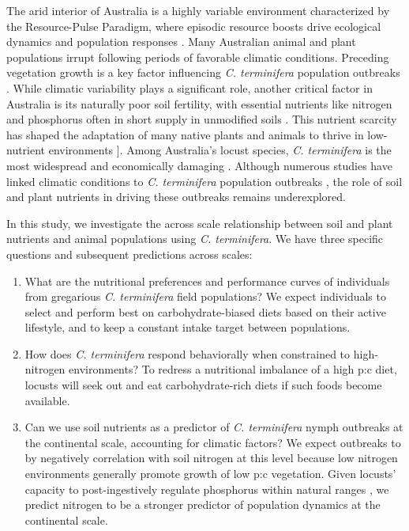 \documentclass[
]{article}
\begin{document}
The arid interior of Australia is a highly variable environment
\citep{morton_fresh_2011} characterized by the Resource-Pulse Paradigm,
where episodic resource boosts drive ecological dynamics and population
responses \citep{noy-meir_desert_1974, whitford_ecology_2002}. Many
Australian animal and plant populations irrupt following periods of
favorable climatic conditions. Preceding vegetation growth is a key
factor influencing \emph{C. terminifera} population outbreaks
\citep{lawton_seeing_2022}. While climatic variability plays a
significant role, another critical factor in Australia is its naturally
poor soil fertility, with essential nutrients like nitrogen and
phosphorus often in short supply in unmodified soils
\citep{morton_fresh_2011, orians_ecology_2007}. This nutrient scarcity
has shaped the adaptation of many native plants and animals to thrive in
low-nutrient environments \citep{orians_ecology_2007}{]}. Among
Australia's locust species, \emph{C. terminifera} is the most widespread
and economically damaging \citep{hunter_adaptations_2001}. Although
numerous studies have linked climatic conditions to \emph{C.
terminifera} population outbreaks
\citep{clark_influence_1974, deveson_not_2005, farrow_population_1982, key_general_1945},
the role of soil and plant nutrients in driving these outbreaks remains
underexplored.

In this study, we investigate the across scale relationship between soil
and plant nutrients and animal populations using \emph{C. terminifera}.
We have three specific questions and subsequent predictions across
scales:

\begin{enumerate}
\def\labelenumi{\arabic{enumi}.}
\item
  What are the nutritional preferences and performance curves of
  individuals from gregarious \emph{C. terminifera} field populations?
  We expect individuals to select and perform best on
  carbohydrate-biased diets based on their active lifestyle, and to keep
  a constant intake target between populations.
\item
  How does \emph{C. terminifera} respond behaviorally when constrained
  to high-nitrogen environments? To redress a nutritional imbalance of a
  high p:c diet, locusts will seek out and eat carbohydrate-rich diets
  if such foods become available.
\item
  Can we use soil nutrients as a predictor of \emph{C. terminifera}
  nymph outbreaks at the continental scale, accounting for climatic
  factors? We expect outbreaks to by negatively correlation with soil
  nitrogen at this level because low nitrogen environments generally
  promote growth of low p:c vegetation. Given locusts' capacity to
  post-ingestively regulate phosphorus within natural ranges
  \citep{cease_dietary_2016, zhang_grasshoppers_2014}, we predict
  nitrogen to be a stronger predictor of population dynamics at the
  continental scale.
\end{enumerate}
\end{document}
